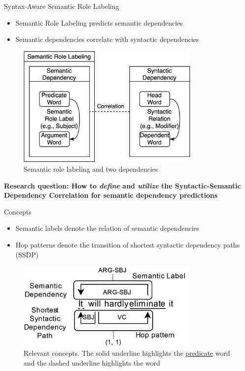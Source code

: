 \begin{block}{Syntax-Aware Semantic Role Labeling}
\vspace{-.5\baselineskip}
\begin{itemize}
    \item Semantic Role Labeling predicts semantic dependencies
    \item Semantic dependencies correlate with syntactic dependencies
\end{itemize}
\vspace{-.5\baselineskip}
\begin{figure}
    \centering
    \includegraphics[width=0.8\textwidth]{images/srl-synsem-intro.png}
    \caption{Semantic role labeling and two dependencies}
    \label{fig:my_label}
\end{figure}
\vspace{-.5\baselineskip}
\textbf{Research question: How to \textit{define} and \textit{utilize} the Syntactic-Semantic Dependency Correlation for semantic dependency predictions}
\end{block}


\begin{block}{Concepts}
\vspace{-.5\baselineskip}
\begin{itemize}
    \item Semantic labels denote the relation of semantic dependencies
    \item Hop patterns denote the transition of shortest syntactic dependency paths (SSDP)
\end{itemize}
\vspace{-.5\baselineskip}
\begin{figure}
    \centering
    \includegraphics[width=0.8\textwidth]{images/synsem-explanation-3.png}
    \caption{Relevant concepts. The solid underline highlights the \underline{predicate} word and the dashed underline highlights the  word}
    \label{fig:my_label}
\end{figure}
\end{block}


